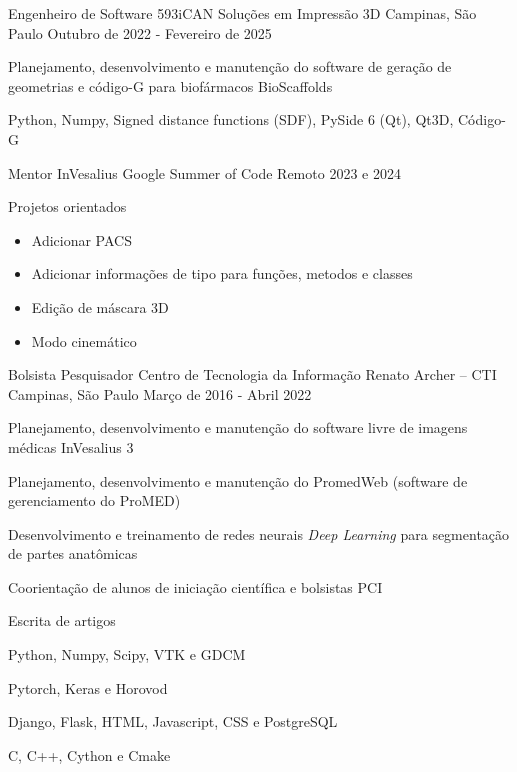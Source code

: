 \begin{cventries}

  \cventry
    {Engenheiro de Software}
    {593iCAN Soluções em Impressão 3D}
    {Campinas, São Paulo}
    {Outubro de 2022 - Fevereiro de 2025}
    {
      \begin{cvitems}
      \item {Planejamento, desenvolvimento e manutenção do software de geração de geometrias e código-G para biofármacos BioScaffolds}
      \item {Python, Numpy, Signed distance functions (SDF), PySide 6 (Qt), Qt3D, Código-G}
      \end{cvitems}
    }

  \cventry
  {Mentor InVesalius}
  {Google Summer of Code}
  {Remoto}
  {2023 e 2024}
  {
    \begin{cvitems}
    \item{Projetos orientados}
      \begin{itemize}
      \item{Adicionar PACS}
      \item{Adicionar informações de tipo para funções, metodos e classes}
      \item{Edição de máscara 3D}
      \item{Modo cinemático}
      \end{itemize}
    \end{cvitems}
  }

  \cventry
    {Bolsista Pesquisador}
    {Centro de Tecnologia da Informação Renato Archer – CTI}
    {Campinas, São Paulo}
    {Março de 2016 - Abril 2022}
    {
      \begin{cvitems}
      \item {Planejamento, desenvolvimento e manutenção do software livre de imagens médicas InVesalius 3}
      \item {Planejamento, desenvolvimento e manutenção do PromedWeb (software de gerenciamento do ProMED)}
      \item {Desenvolvimento e treinamento de redes neurais \textit{Deep Learning} para segmentação de partes anatômicas}
      \item {Coorientação de alunos de iniciação científica e bolsistas PCI}
      \item {Escrita de artigos}
      \item {Python, Numpy, Scipy, VTK e GDCM}
      \item {Pytorch, Keras e Horovod}
      \item {Django, Flask, HTML, Javascript, CSS e PostgreSQL}
      \item {C, C++, Cython e Cmake}
      \end{cvitems}
    }


\end{cventries}
